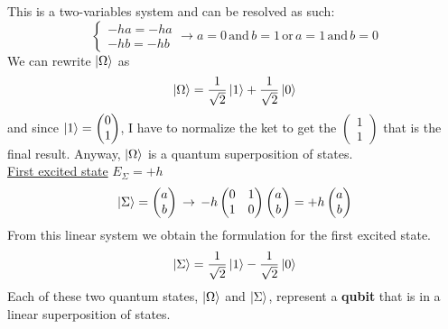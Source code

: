 This is a two-variables system and can be resolved as such:
\[
\begin{cases}-ha=-ha\\-hb=-hb\end{cases}\rightarrow a=0\, \text{and}\, b=1\, \text{or}\, a=1\, \text{and}\, b=0
\]
We can rewrite $\ket{\Omega}$ as
\[\ket{\Omega}=\frac{1}{\sqrt{2}}\ket{1}+\frac{1}{\sqrt{2}}\ket{0}\]
and since $\ket{1}=\begin{pmatrix}0\\1\end{pmatrix}$, I have to normalize the ket to get the $\begin{pmatrix}1\\1\end{pmatrix}$ that is the final result. Anyway, $\ket{\Omega}$ is a quantum superposition of states.\\
\ul{First excited state} $E_\Sigma=+h$
\[\ket{\Sigma}=\begin{pmatrix}a\\b\end{pmatrix}\,\rightarrow\,
-h\begin{pmatrix}0&1\\1&0\end{pmatrix}\begin{pmatrix}a\\b\end{pmatrix}=+h\begin{pmatrix}a\\b\end{pmatrix}\]
From this linear system we obtain the formulation for the first excited state.
\[\ket{\Sigma}=\frac{1}{\sqrt{2}}\ket{1}-\frac{1}{\sqrt{2}}\ket{0}\]
Each of these two quantum states, $\ket{\Omega}$ and $\ket{\Sigma}$, represent a \textbf{qubit} that is in a linear superposition of states.\\
